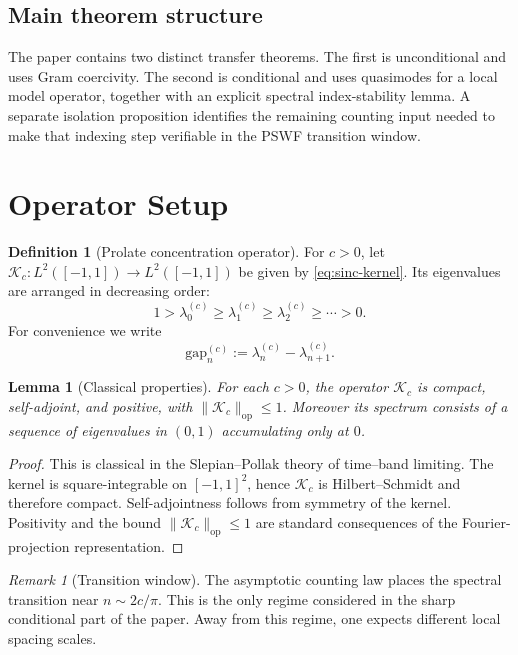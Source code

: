 \documentclass[12pt,a4paper]{amsart}
\newtheorem{lemma}[theorem]{Lemma}
\theoremstyle{definition}
\newtheorem{definition}[theorem]{Definition}
\theoremstyle{remark}
\newtheorem{remark}[theorem]{Remark}
\newcommand{\norm}[1]{\|#1\|}
\newcommand{\Kc}{\mathcal{K}_c}
\newcommand{\lambdac}[2]{\lambda_{#2}^{(#1)}}
\newcommand{\gapc}[2]{\mathrm{gap}_{#2}^{(#1)}}
\newcommand{\op}{\mathrm{op}}
\begin{document}
\subsection{Main theorem structure}

The paper contains two distinct transfer theorems.
The first is unconditional and uses Gram coercivity.
The second is conditional and uses quasimodes for a local model operator,
together with an explicit spectral index-stability lemma.
A separate isolation proposition identifies the remaining counting input
needed to make that indexing step verifiable in the PSWF transition window.

\section{Operator Setup}
\label{sec:setup}

\begin{definition}[Prolate concentration operator]
For $c>0$, let $\Kc:L^2([-1,1])\to L^2([-1,1])$ be given by
\eqref{eq:sinc-kernel}.
Its eigenvalues are arranged in decreasing order:
\[
  1 > \lambdac{c}{0} \ge \lambdac{c}{1} \ge \lambdac{c}{2} \ge \cdots > 0.
\]
For convenience we write
\[
  \gapc{c}{n} := \lambdac{c}{n} - \lambdac{c}{n+1}.
\]
\end{definition}

\begin{lemma}[Classical properties]
\label{lem:classical}
For each $c>0$, the operator $\Kc$ is compact, self-adjoint, and positive,
with $\norm{\Kc}_{\op}\le 1$.
Moreover its spectrum consists of a sequence of eigenvalues in $(0,1)$
accumulating only at $0$.
\end{lemma}

\begin{proof}
This is classical in the Slepian--Pollak theory of time--band limiting.
The kernel is square-integrable on $[-1,1]^2$, hence $\Kc$ is
Hilbert--Schmidt and therefore compact.
Self-adjointness follows from symmetry of the kernel.
Positivity and the bound $\norm{\Kc}_{\op}\le 1$ are standard consequences
of the Fourier-projection representation.
\end{proof}

\begin{remark}[Transition window]
The asymptotic counting law places the spectral transition near
$n\sim 2c/\pi$.
This is the only regime considered in the sharp conditional part of the
paper.
Away from this regime, one expects different local spacing scales.
\end{remark}
\end{document}
